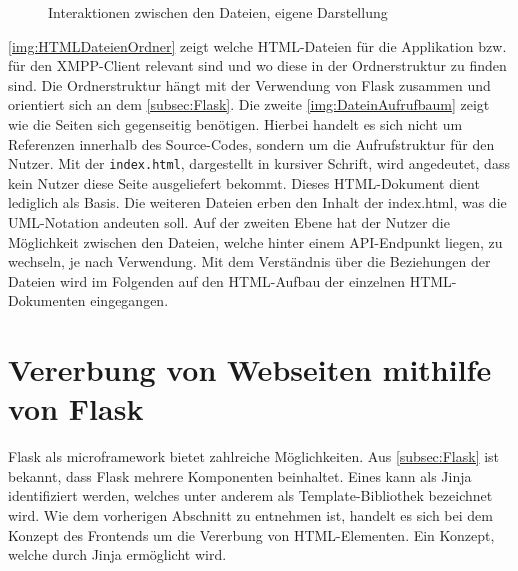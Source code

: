 \documentclass[a4paper,titlepage,halfparskip,12pt]{scrreprt}
\begin{document}
\begin{onehalfspacing}
\begin{figure}[h]
\begin{minipage}[c]{.5\textwidth}
		\caption{Interaktionen zwischen den Dateien, eigene Darstellung}
		\label{img:DateinAufrufbaum}
	\end{minipage}
\end{figure}
\autoref{img:HTMLDateienOrdner} zeigt welche HTML-Dateien für die Applikation bzw. für den XMPP-Client relevant sind und wo diese in der Ordnerstruktur zu finden sind. Die Ordnerstruktur hängt mit der Verwendung von Flask zusammen und orientiert sich an dem \autoref{subsec:Flask}. Die zweite \autoref{img:DateinAufrufbaum} zeigt wie die Seiten sich gegenseitig benötigen. Hierbei handelt es sich nicht um Referenzen innerhalb des Source-Codes, sondern um die Aufrufstruktur für den Nutzer. Mit der \texttt{index.html}, dargestellt in kursiver Schrift, wird angedeutet, dass kein Nutzer diese Seite ausgeliefert bekommt. Dieses \ac{HTML}-Dokument dient lediglich als Basis. Die weiteren Dateien erben den Inhalt der index.html, was die UML-Notation andeuten soll. Auf der zweiten Ebene hat der Nutzer die Möglichkeit zwischen den Dateien, welche hinter einem API-Endpunkt liegen, zu wechseln, je nach Verwendung. Mit dem Verständnis über die Beziehungen der Dateien wird im Folgenden auf den \ac{HTML}-Aufbau der einzelnen HTML-Dokumenten eingegangen.

\section{Vererbung von Webseiten mithilfe von Flask}
\label{subsec:TemplateInheritance}
Flask als microframework bietet zahlreiche Möglichkeiten. Aus \autoref{subsec:Flask} ist bekannt, dass Flask mehrere Komponenten beinhaltet. Eines kann als Jinja identifiziert werden, welches unter anderem als Template-Bibliothek bezeichnet wird. Wie dem vorherigen Abschnitt zu entnehmen ist, handelt es sich bei dem Konzept des Frontends um die Vererbung von HTML-Elementen. Ein Konzept, welche durch Jinja ermöglicht wird.


\end{onehalfspacing}
\end{document}

